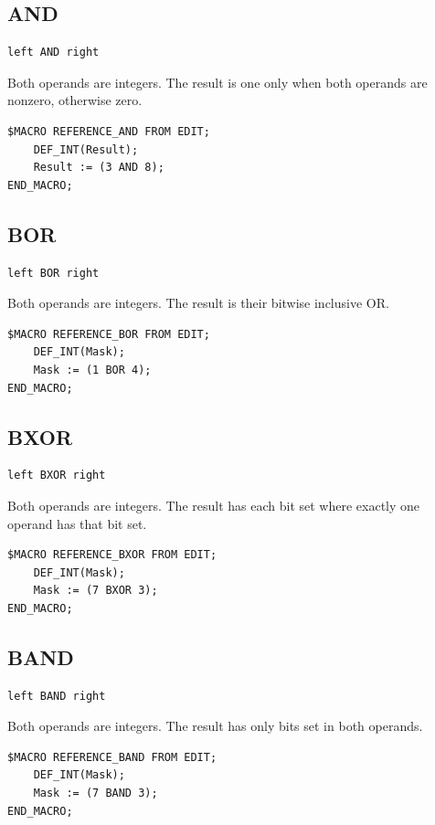 \documentclass[a4paper,10pt,twoside,openany]{book}
\newenvironment{mrmacextension}{\begin{changebar}}{\end{changebar}}
\begin{document}
\label{prim:operator-and}
\subsection*{AND}
\begin{verbatim}
left AND right
\end{verbatim}
Both operands are integers. The result is one only when both operands are
nonzero, otherwise zero.
\begin{verbatim}
$MACRO REFERENCE_AND FROM EDIT;
    DEF_INT(Result);
    Result := (3 AND 8);
END_MACRO;
\end{verbatim}

\begin{mrmacextension}
\label{prim:operator-bor}
\subsection*{BOR}
\begin{verbatim}
left BOR right
\end{verbatim}
Both operands are integers. The result is their bitwise inclusive OR.
\begin{verbatim}
$MACRO REFERENCE_BOR FROM EDIT;
    DEF_INT(Mask);
    Mask := (1 BOR 4);
END_MACRO;
\end{verbatim}
\end{mrmacextension}

\begin{mrmacextension}
\label{prim:operator-bxor}
\subsection*{BXOR}
\begin{verbatim}
left BXOR right
\end{verbatim}
Both operands are integers. The result has each bit set where exactly one
operand has that bit set.
\begin{verbatim}
$MACRO REFERENCE_BXOR FROM EDIT;
    DEF_INT(Mask);
    Mask := (7 BXOR 3);
END_MACRO;
\end{verbatim}
\end{mrmacextension}

\begin{mrmacextension}
\label{prim:operator-band}
\subsection*{BAND}
\begin{verbatim}
left BAND right
\end{verbatim}
Both operands are integers. The result has only bits set in both operands.
\begin{verbatim}
$MACRO REFERENCE_BAND FROM EDIT;
    DEF_INT(Mask);
    Mask := (7 BAND 3);
END_MACRO;
\end{verbatim}
\end{mrmacextension}
\end{document}
